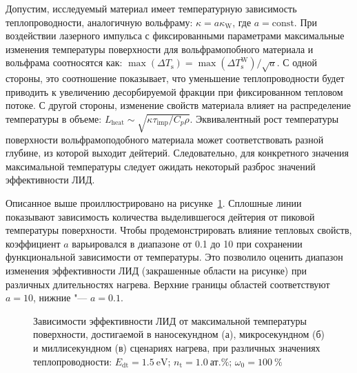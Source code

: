 Допустим, исследуемый материал имеет температурную зависимость теплопроводности, аналогичную вольфраму: \( \kappa = a\kappa_\mathrm{W} \), где \(a=\mathrm{const}\). При воздействии лазерного импульса с фиксированными параметрами максимальные изменения температуры поверхности для вольфрамопобного материала и вольфрама соотносятся как: \( \max(\Delta T_\mathrm{s}) = \max(\Delta T_\mathrm{s}^{\mathrm{W}})/\sqrt{a} \). С одной стороны, это соотношение показывает, что уменьшение теплопроводности будет приводить к увеличению десорбируемой фракции при фиксированном тепловом потоке. С другой стороны, изменение свойств материала влияет на распределение температуры в объеме: \(L_\mathrm{heat}\sim \sqrt{\kappa\tau_\mathrm{imp}/C_p \rho} \). Эквивалентный рост температуры поверхности вольфрамоподобного материала может соответствовать разной глубине, из которой выходит дейтерий. Следовательно, для конкретного значения максимальной температуры следует ожидать некоторый разброс значений эффективности ЛИД.

Описанное выше проиллюстрировано на рисунке~\cref{fig:ch4/LID_kappa_var}. Сплошные линии показывают зависимость количества выделившегося дейтерия от пиковой температуры поверхности. Чтобы продемонстрировать влияние тепловых свойств, коэффициент \(a\) варьировался в диапазоне от \num{0.1} до \num{10} при сохранении функциональной зависимости от температуры. Это позволило оценить диапазон изменения эффективности ЛИД (закрашенные области на рисунке) при различных длительностях нагрева. Верхние границы областей соответствуют \( a=\num{10} \), нижние "--- \( a=\num{0.1} \).
\begin{figure}[ht]
    \caption{Зависимости эффективности ЛИД от максимальной температуры поверхности, достигаемой в наносекундном (а), микросекундном (б) и миллисекундном (в) сценариях нагрева, при различных значениях теплопроводности: \(E_\mathrm{dt}=\SI{1.5}{\electronvolt}\); \(n_\mathrm{t}=\SI{1.0}{\text{ат.}\percent}\); \( \omega_0=\SI{100}{\percent}\)}\label{fig:ch4/LID_kappa_var}
\end{figure}

